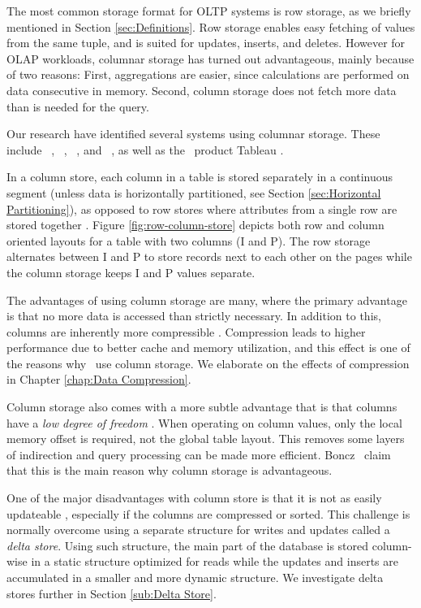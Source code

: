 The most common storage format for OLTP systems is row storage, as we briefly mentioned in Section \ref{sec:Definitions}. Row storage enables easy fetching of values from the same tuple, and is suited for updates, inserts, and deletes. However for OLAP workloads, columnar storage has turned out advantageous, mainly because of two reasons: First, aggregations are easier, since calculations are performed on data consecutive in memory. Second, column storage does not fetch more data than is needed for the query.

Our research have identified several systems using columnar storage. These include \monetdb~\cite{Boncz2002-yj, Boncz2005-wj}, \cstore~\cite{Stonebraker2005-qz}, \saph~\cite{Farber2012-vh}, and \mssql~\cite{noauthor_undated-vq, Larson2013-mc}, as well as the \bd~product Tableau \cite{Kamkolkar2015-iq}.

In a column store, each column in a table is stored separately in a continuous segment (unless data is horizontally partitioned, see Section \ref{sec:Horizontal Partitioning}), as opposed to row stores where attributes from a single row are stored together \cite{Bjorklund2011-wh}. Figure \ref{fig:row-column-store} depicts both row and column oriented layouts for a table with two columns (I and P). The row storage alternates between I and P to store records next to each other on the pages while the column storage keeps I and P values separate. 

The advantages of using column storage are many, where the primary advantage is that no more data is accessed than strictly necessary. In addition to this, columns are inherently more compressible \cite{noauthor_undated-vq}. Compression leads to higher performance due to better cache and memory utilization, and this effect is one of the reasons why \mssql~use column storage. We elaborate on the effects of compression in Chapter \ref{chap:Data Compression}.

Column storage also comes with a more subtle advantage that is that columns have a \textit{low degree of freedom} \cite{Boncz2005-wj}. When operating on column values, only the local memory offset is required, not the global table layout. This removes some layers of indirection and query processing can be made more efficient. Boncz \ea~claim that this is the main reason why column storage is advantageous.


One of the major disadvantages with column store is that it is not as easily updateable \cite{Bjorklund2011-wh}, especially if the columns are compressed or sorted. This challenge is normally overcome using a separate structure for writes and updates called a \textit{delta store}. Using such structure, the main part of the database is stored column-wise in a static structure optimized for reads while the updates and inserts are accumulated in a smaller and more dynamic structure. We investigate delta stores further in Section \ref{sub:Delta Store}.

